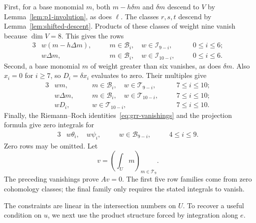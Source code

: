 First, for a base monomial $m$, both $m-h\delta m$ and $\delta m$
descend to $V$ by Lemma~\ref{lem:p1-involution}, as does $\ell$.
The classes $r,s,t$ descend by Lemma~\ref{lem:shifted-descent}.
Products of these classes of
weight nine vanish because $\dim V=8$. This gives the rows
\begin{alignat}{3}
 &w(m-h\Delta m),&&\quad m\in\mathcal B_i,\quad
 w\in\mathcal I_{9-i},&&\quad0\le i\le6;\label{eq:matrix-rows-a}\\
 &w\Delta m,&&\quad m\in\mathcal B_i,\quad
 w\in\mathcal I_{10-i},&&\quad0\le i\le6.\label{eq:matrix-rows-b}
\end{alignat}
Second, a base monomial $m$ of weight greater than six vanishes,
as does $\delta m$. Also $x_i=0$ for $i\ge7$, so
$D_i=\delta x_i$ evaluates to zero. Their multiples give
\begin{alignat}{3}
 &wm,&&\quad m\in\mathcal B_i,\quad
 w\in\mathcal T_{9-i},&&\quad7\le i\le10;\label{eq:matrix-rows-c}\\
 &w\Delta m,&&\quad m\in\mathcal B_i,\quad
 w\in\mathcal T_{10-i},&&\quad7\le i\le10;\label{eq:matrix-rows-d}\\
 &wD_i,&&\quad w\in\mathcal T_{10-i},&&\quad7\le i\le10.\label{eq:matrix-rows-e}
\end{alignat}
Finally, the Riemann--Roch identities~\eqref{eq:grr-vanishings} and
the projection formula give zero integrals for
\begin{alignat}{3}
 &w\theta_i,\quad w\psi_i,&&\quad w\in\mathcal B_{9-i},&&\quad4\le i\le9.
 \label{eq:matrix-rows-f}
\end{alignat}
Zero rows may be omitted. Let
\[
 v=\left(\int_U m\right)_{m\in\mathcal T_9}.
\]
The preceding vanishings prove $Av=0$. The first five row families
come from zero cohomology classes; the final family only requires
the stated integrals to vanish.

The constraints are linear in the intersection numbers on $U$. To
recover a useful condition on $u$, we next use the product structure
forced by integration along $e$.

